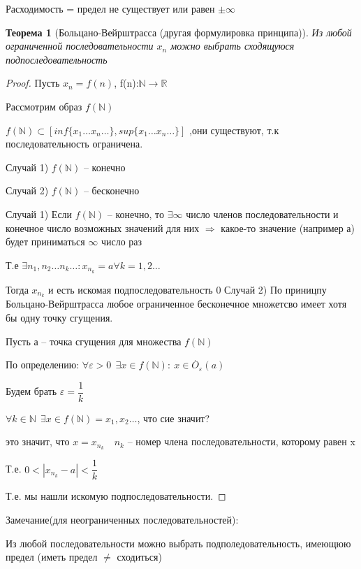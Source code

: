 \documentclass{book}
\newtheorem{Th}{Теорема}[chapter]
\begin{document}
Расходимость = предел не существует или равен $\pm \infty$

\begin{Th}[Больцано-Вейрштрасса (другая формулировка принципа)]
	Из любой ограниченной последовательности $x_n$ можно выбрать сходящуюся подпоследовательность 
\end{Th}

\begin{proof}
	Пусть  $x_n = f(n)$, f(n):$\mathds{N}\rightarrow \mathds{R}$
	
	Рассмотрим образ $f(\mathds{N})$
	
	$f(\mathds{N})\subset [inf\{x_1 \hdots x_n \hdots\}, sup\{x_1 \hdots x_n \hdots\}]$ ,они существуют, т.к последовательность ограничена.
	
	Случай 1) $f(\mathds{N})$ -- конечно
	
	Случай 2) $f(\mathds{N})$ -- бесконечно
	
	Случай 1) Если $f(\mathds{N})$ -- конечно, то $\exists \infty$ число членов последовательности и конечное число возможных значений для них $\Rightarrow$ какое-то значение (например а) будет приниматься $\infty$ число раз
	
	Т.е $\exists n_1, n_2 \hdots n_k \hdots: x_{n_k} = a \forall k = 1, 2\hdots$
	
	Тогда $x_{n_k}$ и есть искомая подпоследовательность
	0
	Случай 2) 
	По приницпу Больцано-Вейрштрасса любое ограниченное бесконечное множетсво имеет хотя бы одну точку сгущения.
	
	Пусть а -- точка сгущения для множества $f(\mathds{N})$
	
	По определению: $\forall \varepsilon >0~~ \exists x \in f(\mathds{N}):~x \in \overset{.}{O}_{\varepsilon}(a)$
	
	Будем брать $\varepsilon = \dfrac{1}{k}$
	
	$\forall k \in \mathds{N}~~ \exists x \in f(\mathds{N})={x_1, x_2 \hdots}$, что сие значит?
	
	это значит, что $x = x_{n_k}\quad n_k$ -- номер члена последовательности, которому равен x 
	
	Т.е. $0<|x_{n_k}-a|<\dfrac{1}{k}$
	
	Т.е. мы нашли искомую подпоследовательности.
\end{proof}

Замечание(для неограниченных последовательностей):

Из любой последовательности можно выбрать подполедовательность, имеющюю предел (иметь предел $\neq$ сходиться)
\end{document}
